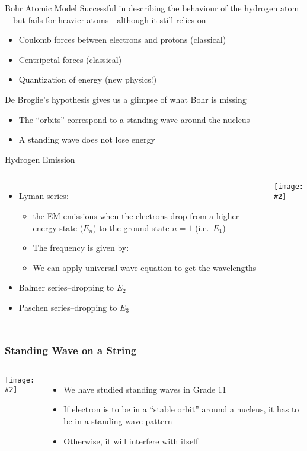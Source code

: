 \documentclass[12pt,compress,aspectratio=169]{beamer}
\newcommand{\pic}[2]{\texttt{[image: \#2]}}
\newcommand{\eq}[2]{\vspace{#1}{\Large\begin{displaymath}#2\end{displaymath}}}
\begin{document}
\begin{frame}{Bohr Atomic  Model}
  Successful in describing the behaviour of the hydrogen atom---but fails for
  heavier atoms---although it still relies on 
  \begin{itemize}
  \item Coulomb forces between electrons and protons (classical)
  \item Centripetal forces (classical)
  \item Quantization of energy (new physics!)
  \end{itemize}
  De Broglie's hypothesis gives us a glimpse of what Bohr is missing
  \begin{itemize}
  \item The ``orbits'' correspond to a standing wave around the nucleus
  \item A standing wave does not lose energy
  \end{itemize}
\end{frame}


\begin{frame}{Hydrogen Emission}
  \begin{columns}

    \begin{itemize}
    \item Lyman series:
      \begin{itemize}
      \item the EM emissions when the electrons drop from a higher energy state
        ($E_n$) to the ground state $n=1$ (i.e.\ $E_1$)
      \item The frequency is given by:
        
        \eq{-.2in}{
          f=\frac{E_1-E_n}{h}
        }
      \item We can apply universal wave equation to get the wavelengths
      \end{itemize}
    \item Balmer series--dropping to $E_2$
    \item Paschen series--dropping to $E_3$
    \end{itemize}

    \pic{1}{400px-Hydrogen_transitions.png}
  \end{columns}
\end{frame}


\begin{frame}
  \frametitle{Standing Wave on a String}
  \begin{columns}
    \pic{1}{strhar.png}

    \begin{itemize}
    \item We have studied standing waves in Grade 11
    \item If electron is to be in a ``stable orbit'' around a nucleus, it has
      to be in a standing wave pattern
    \item Otherwise, it will interfere with itself
    \end{itemize}
  \end{columns}
\end{frame}
\end{document}
